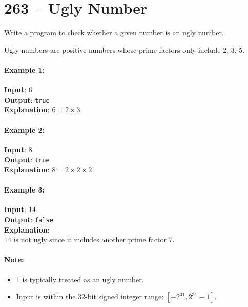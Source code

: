 \section{263 -- Ugly Number}
Write a program to check whether a given number is an ugly number.
\par
Ugly numbers are positive numbers whose prime factors only include 2, 3, 5.

\paragraph{Example 1:}

\begin{flushleft}
\textbf{Input}: 6
\\
\textbf{Output}: \texttt{true}
\\
\textbf{Explanation}: $6 = 2 \times 3$
\end{flushleft}


\paragraph{Example 2:}

\begin{flushleft}
\textbf{Input}: 8
\\
\textbf{Output}: \texttt{true}
\\
\textbf{Explanation}: $8 = 2 \times 2 \times 2$
\end{flushleft}

\paragraph{Example 3:}

\begin{flushleft}
\textbf{Input}: 14
\\
\textbf{Output}: \texttt{false} 
\\
\textbf{Explanation}: 
\\
14 is not ugly since it includes another prime factor 7.
\end{flushleft}

\paragraph{Note:}
\begin{itemize}
\item 1 is typically treated as an ugly number.
\item Input is within the 32-bit signed integer range: $[−2^{31},  2^{31} − 1]$.
\end{itemize}
